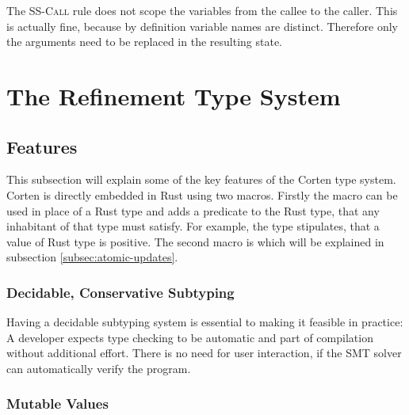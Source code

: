 \documentclass[twoside, english]{sdqthesis}
\theoremstyle{definition}
\begin{document}
The \textsc{SS-Call} rule does not scope the variables from the callee to the caller. This is actually fine, because by definition variable names are distinct. Therefore only the arguments need to be replaced in the resulting state.

\chapter{The Refinement Type System} \label{ch:type-system}


\section{Features}

This subsection will explain some of the key features of the Corten type system.
Corten is directly embedded in Rust using two macros. Firstly the macro  can be used in place of a Rust type and adds a predicate to the Rust type, that any inhabitant of that type must satisfy. For example, the type  stipulates, that a value of Rust type  is positive. The second macro is  which will be explained in subsection \ref{subsec:atomic-updates}.

\subsection{Decidable, Conservative Subtyping}

Having a decidable subtyping system is essential to making it feasible in practice: A developer expects type checking to be automatic and part of compilation without additional effort. There is no need for user interaction, if the SMT solver can automatically verify the program.

\subsection{Mutable Values}
\end{document}
